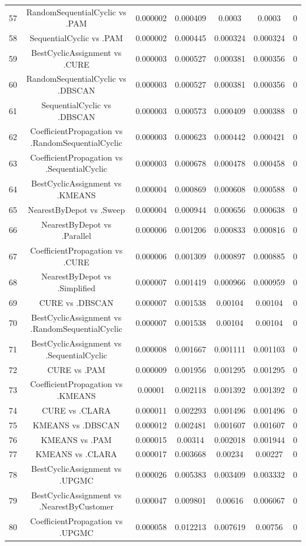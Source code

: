 \documentclass[a4paper,10pt]{article}
\begin{document}
\begin{landscape}
\begin{table}[!htp]
\begin{tabular}{ccccccc}
57&RandomSequentialCyclic vs .PAM&0.000002&0.000409&0.0003&0.0003&0\\
58&SequentialCyclic vs .PAM&0.000002&0.000445&0.000324&0.000324&0\\
59&BestCyclicAssignment vs .CURE&0.000003&0.000527&0.000381&0.000356&0\\
60&RandomSequentialCyclic vs .DBSCAN&0.000003&0.000527&0.000381&0.000356&0\\
61&SequentialCyclic vs .DBSCAN&0.000003&0.000573&0.000409&0.000388&0\\
62&CoefficientPropagation vs .RandomSequentialCyclic&0.000003&0.000623&0.000442&0.000421&0\\
63&CoefficientPropagation vs .SequentialCyclic&0.000003&0.000678&0.000478&0.000458&0\\
64&BestCyclicAssignment vs .KMEANS&0.000004&0.000869&0.000608&0.000588&0\\
65&NearestByDepot vs .Sweep&0.000004&0.000944&0.000656&0.000638&0\\
66&NearestByDepot vs .Parallel&0.000006&0.001206&0.000833&0.000816&0\\
67&CoefficientPropagation vs .CURE&0.000006&0.001309&0.000897&0.000885&0\\
68&NearestByDepot vs .Simplified&0.000007&0.001419&0.000966&0.000959&0\\
69&CURE vs .DBSCAN&0.000007&0.001538&0.00104&0.00104&0\\
70&BestCyclicAssignment vs .RandomSequentialCyclic&0.000007&0.001538&0.00104&0.00104&0\\
71&BestCyclicAssignment vs .SequentialCyclic&0.000008&0.001667&0.001111&0.001103&0\\
72&CURE vs .PAM&0.000009&0.001956&0.001295&0.001295&0\\
73&CoefficientPropagation vs .KMEANS&0.00001&0.002118&0.001392&0.001392&0\\
74&CURE vs .CLARA&0.000011&0.002293&0.001496&0.001496&0\\
75&KMEANS vs .DBSCAN&0.000012&0.002481&0.001607&0.001607&0\\
76&KMEANS vs .PAM&0.000015&0.00314&0.002018&0.001944&0\\
77&KMEANS vs .CLARA&0.000017&0.003668&0.00234&0.00227&0\\
78&BestCyclicAssignment vs .UPGMC&0.000026&0.005383&0.003409&0.003332&0\\
79&BestCyclicAssignment vs .NearestByCustomer&0.000047&0.009801&0.00616&0.006067&0\\
80&CoefficientPropagation vs .UPGMC&0.000058&0.012213&0.007619&0.00756&0\\

\end{tabular}
\end{table}
\end{landscape}
\end{document}
